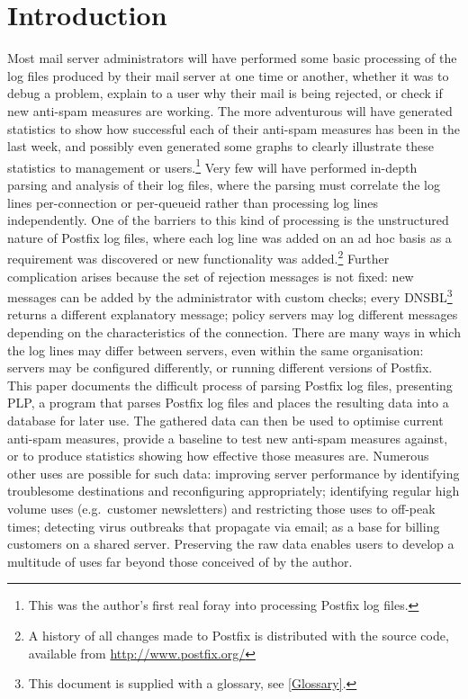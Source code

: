\section{Introduction}

\label{introduction}

Most mail server administrators will have performed some basic processing
of the log files produced by their mail server at one time or another,
whether it was to debug a problem, explain to a user why their mail is
being rejected, or check if new anti-spam measures are working.  The more
adventurous will have generated statistics to show how successful each of
their anti-spam measures has been in the last week, and possibly even
generated some graphs to clearly illustrate these statistics to management
or users.\footnote{This was the author's first real foray into processing
Postfix log files.}  Very few will have performed in-depth parsing and
analysis of their log files, where the parsing must correlate the log lines
per-connection or per-queueid rather than processing log lines
independently.  One of the barriers to this kind of processing is the
unstructured nature of Postfix log files, where each log line was added on
an ad hoc basis as a requirement was discovered or new functionality was
added.\footnote{A history of all changes made to Postfix is distributed
with the source code, available from \url{http://www.postfix.org/}} Further
complication arises because the set of rejection messages is not fixed: new
messages can be added by the administrator with custom checks; every
\gls{DNSBL}\footnote{This document is supplied with a glossary, see
\textsection\ref{Glossary}.} returns a different explanatory message;
policy servers may log different messages depending on the characteristics
of the connection.  There are many ways in which the log lines may differ
between servers, even within the same organisation: servers may be
configured differently, or running different versions of Postfix.  This
paper documents the difficult process of parsing Postfix log files,
presenting \gls{PLP}, a program that parses Postfix log files and places
the resulting data into a database for later use.  The gathered data can
then be used to optimise current anti-spam measures, provide a baseline to
test new anti-spam measures against, or to produce statistics showing how
effective those measures are.  Numerous other uses are possible for such
data: improving server performance by identifying troublesome destinations
and reconfiguring appropriately; identifying regular high volume uses
(e.g.\ customer newsletters) and restricting those uses to off-peak times;
detecting virus outbreaks that propagate via email; as a base for billing
customers on a shared server.  Preserving the raw data enables users to
develop a multitude of uses far beyond those conceived of by the author.

